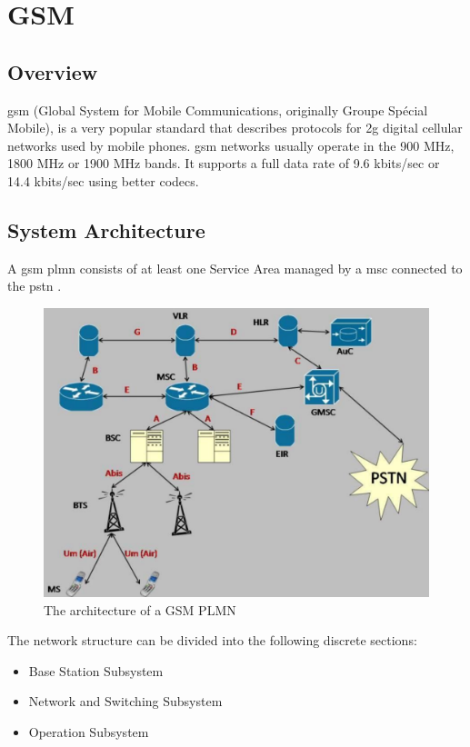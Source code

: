 \chapter{GSM}

\section{Overview}

\acrshort{gsm} (Global System for Mobile Communications, originally Groupe Sp\'ecial 
Mobile), is a very popular standard that describes protocols for \gls{2g} 
digital cellular networks used by mobile phones. \gls{gsm} networks 
usually operate in the 900 MHz, 1800 MHz or 1900 MHz bands. It supports a full
data rate of 9.6 kbits/sec or 14.4 kbits/sec using better codecs.


\section{System Architecture}

A \gls{gsm} \gls{plmn} consists of at least one Service Area
managed by a \gls{msc} connected to the \gls{pstn} \cite{arcadaFi2}.

\begin{figure}
\centering
\includegraphics[scale=0.5]{../images/gsmNetwork}
\caption[GSM PLMN architecture]{The architecture of a GSM PLMN
 {\cite{gnuradioFullNet}}}
\end{figure}

The network structure can be divided into the following discrete sections:
\begin{itemize}[noitemsep,topsep=0pt,parsep=0pt,partopsep=0pt]
\item Base Station Subsystem
\item Network and Switching Subsystem
\item Operation Subsystem
\end{itemize}



